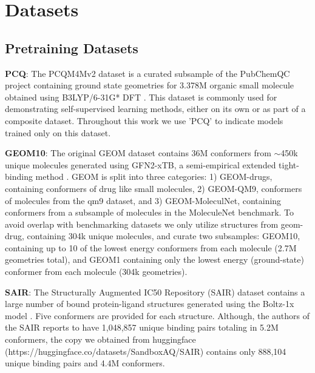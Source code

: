


\section{Datasets}
\label{appendix_datasets}

\subsection{Pretraining Datasets}

\textbf{PCQ}: The PCQM4Mv2 dataset is a curated subsample of the PubChemQC project containing ground state geometries for 3.378M organic small molecule obtained using B3LYP/6-31G* DFT \cite{PubChemQC_Nakata2017}. This dataset is commonly used for demonstrating self-supervised learning methods, either on its own or as part of a composite dataset. Throughout this work we use 'PCQ' to indicate models trained only on this dataset. 


\textbf{GEOM10}: The original GEOM dataset contains 36M conformers from $\sim$450k unique molecules generated using GFN2-xTB, a semi-empirical extended tight-binding method \cite{GEOM_axelrod2022}. GEOM is split into three categories: 1) GEOM-drugs, containing conformers of drug like small molecules, 2) GEOM-QM9, conformers of molecules from the qm9 dataset, and 3) GEOM-MoleculNet, containing conformers from a subsample of molecules in the MoleculeNet benchmark. To avoid overlap with benchmarking datasets we only utilize structures from geom-drug, containing 304k unique molecules, and curate two subsamples: GEOM10, containing up to 10 of the lowest energy conformers from each molecule (2.7M geometries total), and GEOM1 containing only the lowest energy (ground-state) conformer from each molecule (304k geometries). 

\textbf{SAIR}: The Structurally Augmented IC50 Repository (SAIR) dataset contains a large number of bound protein-ligand structures generated using the Boltz-1x model \cite{boltz1_2024}. Five conformers are provided for each structure. Although, the authors of the SAIR reports to have 1,048,857 unique binding pairs totaling in 5.2M conformers, the copy we obtained from huggingface (https://huggingface.co/datasets/SandboxAQ/SAIR) contains only 888,104 unique binding pairs and 4.4M conformers. 

